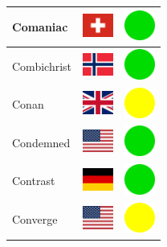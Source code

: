 \documentclass[12pt, a4paper, twoside]{report}
\begin{document}
\begin{center}
\begin{longtable}{|p{5cm}|p{2cm}|p{2cm}|}
 Comaniac                                                   & \includegraphics[width=1cm]{../4x3/ch} &   \includegraphics[width=1cm]{../likes/y} \\ \hline
 Combichrist                                                & \includegraphics[width=1cm]{../4x3/no} &   \includegraphics[width=1cm]{../likes/y} \\ \hline
 Conan                                                      & \includegraphics[width=1cm]{../4x3/gb} &   \includegraphics[width=1cm]{../likes/m} \\ \hline
 Condemned                                                  & \includegraphics[width=1cm]{../4x3/us} &   \includegraphics[width=1cm]{../likes/y} \\ \hline
 Contrast                                                   & \includegraphics[width=1cm]{../4x3/de} &   \includegraphics[width=1cm]{../likes/y} \\ \hline
 Converge                                                   & \includegraphics[width=1cm]{../4x3/us} &   \includegraphics[width=1cm]{../likes/m} \\ \hline

\end{longtable}
\end{center}
\end{document}

